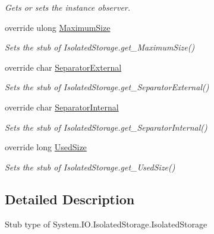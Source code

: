 \begin{DoxyCompactItemize}
\begin{DoxyCompactList}\small\item\em Gets or sets the instance observer.\end{DoxyCompactList}\item 
override ulong \hyperlink{class_system_1_1_i_o_1_1_isolated_storage_1_1_fakes_1_1_stub_isolated_storage_a058093d02e058fd3987726b2df1c9e3a}{Maximum\-Size}
\begin{DoxyCompactList}\small\item\em Sets the stub of Isolated\-Storage.\-get\-\_\-\-Maximum\-Size()\end{DoxyCompactList}\item 
override char \hyperlink{class_system_1_1_i_o_1_1_isolated_storage_1_1_fakes_1_1_stub_isolated_storage_a128366c5e594561dd369d33d11235f28}{Separator\-External}
\begin{DoxyCompactList}\small\item\em Sets the stub of Isolated\-Storage.\-get\-\_\-\-Separator\-External()\end{DoxyCompactList}\item 
override char \hyperlink{class_system_1_1_i_o_1_1_isolated_storage_1_1_fakes_1_1_stub_isolated_storage_a11ba62b04e42ce5dc4c8d6a775b0e273}{Separator\-Internal}
\begin{DoxyCompactList}\small\item\em Sets the stub of Isolated\-Storage.\-get\-\_\-\-Separator\-Internal()\end{DoxyCompactList}\item 
override long \hyperlink{class_system_1_1_i_o_1_1_isolated_storage_1_1_fakes_1_1_stub_isolated_storage_a156998f712fd8f8f1b62c75319feab88}{Used\-Size}
\begin{DoxyCompactList}\small\item\em Sets the stub of Isolated\-Storage.\-get\-\_\-\-Used\-Size()\end{DoxyCompactList}\end{DoxyCompactItemize}


\subsection{Detailed Description}
Stub type of System.\-I\-O.\-Isolated\-Storage.\-Isolated\-Storage



